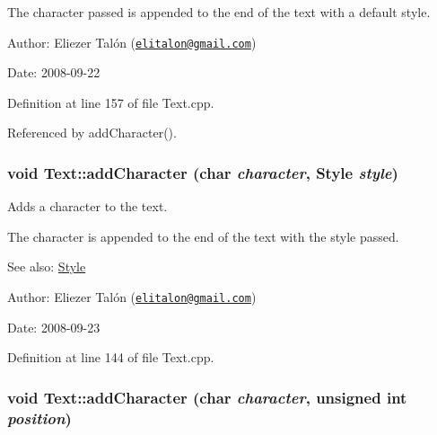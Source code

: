 The character passed is appended to the end of the text with a default style.

\begin{Desc}
\item[Author:]Eliezer Talón (\href{mailto:elitalon@gmail.com}{\tt elitalon@gmail.com}) \end{Desc}
\begin{Desc}
\item[Date:]2008-09-22 \end{Desc}


Definition at line 157 of file Text.cpp.

Referenced by addCharacter().\hypertarget{class_text_757b9caa67089198ac99c06391b910bb}{
\subsubsection[addCharacter]{\setlength{\rightskip}{0pt plus 5cm}void Text::addCharacter (char {\em character}, \/  {\bf Style} {\em style})}}
\label{class_text_757b9caa67089198ac99c06391b910bb}


Adds a character to the text. 

The character is appended to the end of the text with the style passed.

\begin{Desc}
\item[See also:]\hyperlink{class_style}{Style}\end{Desc}
\begin{Desc}
\item[Author:]Eliezer Talón (\href{mailto:elitalon@gmail.com}{\tt elitalon@gmail.com}) \end{Desc}
\begin{Desc}
\item[Date:]2008-09-23 \end{Desc}


Definition at line 144 of file Text.cpp.\hypertarget{class_text_8e2f98d018b51a0b800bb1189ad7d9ae}{
\subsubsection[addCharacter]{\setlength{\rightskip}{0pt plus 5cm}void Text::addCharacter (char {\em character}, \/  unsigned int {\em position})}}
\label{class_text_8e2f98d018b51a0b800bb1189ad7d9ae}


